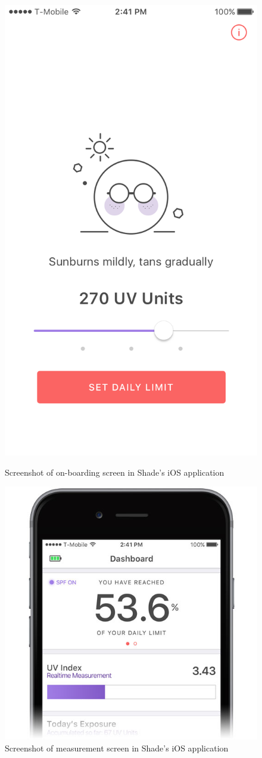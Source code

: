 \documentclass[12pt,openany,a4paper]{book}
\begin{document}
\begin{figure}[h]
\centering
\begin{minipage}{.5\textwidth}
\centering
\includegraphics[height=\linewidth]{ShadeOnboarding.png}
\caption{Screenshot of on-boarding screen in Shade's iOS application}
\label{fig:shade_onboarding}
\end{minipage}\begin{minipage}{.5\textwidth}
\centering
\includegraphics[height=\linewidth]{ShadeMeasurement.jpg}
\caption{Screenshot of measurement screen in Shade's iOS application}
\label{fig:shade_measurement}
\end{minipage}
\end{figure}
\end{document}
